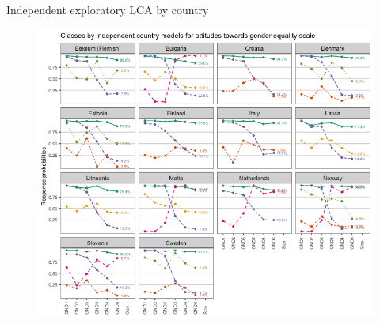 \documentclass[11pt,t]{beamer}
\begin{document}
\begin{frame}[c,plain]{Independent exploratory LCA by country}
\vspace{-11pt}
	
\begin{figure}
	\centering
	\includegraphics[height=0.7\textwidth]{graphics/ByCntryGender.png}
\end{figure}	
\end{frame} 
\end{document}
